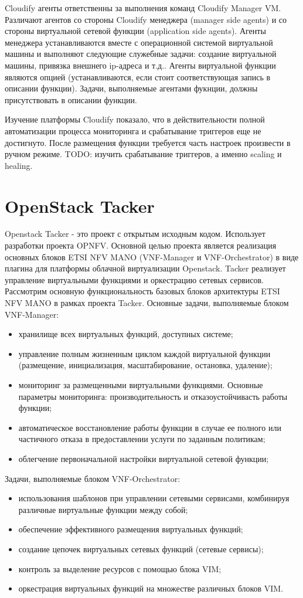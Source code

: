 \documentclass[oneside,final,14pt,a4paper]{extreport}
\begin{document}
Cloudify агенты ответственны за выполнения команд Cloudify Manager VM. Различают агентов со стороны Cloudify менеджера (manager side agents) и со стороны виртуальной сетевой функции (application side agents). Агенты менеджера устанавливаются вместе с операционной системой виртуальной машины и выполняют следующие служебные задачи: создание виртуальной машины, привязка внешнего ip-адреса и т.д.. Агенты виртуальной функции являются опцией (устанавливаются, если стоит соответствующая запись в описании функции). Задачи, выполняемые агентами фукнции, должны присутствовать в описании функции.\cite{cloudify-official-oveview1}

Изучение платформы Cloudify показало, что в действительности полной автоматизации процесса мониторинга и срабатывание триггеров еще не достигнуто. После размещения функции требуется часть настроек произвести в ручном режиме. 
TODO: изучить срабатывание триггеров, а именно scaling и healing.


\section{OpenStack Tacker}
Openstack Tacker - это проект с открытым исходным кодом. Использует разработки проекта OPNFV. Основной целью проекта является реализация основных блоков ETSI NFV MANO (VNF-Manager и VNF-Orchestrator) в виде плагина для платформы облачной виртуализации Openstack. Tacker реализует управление виртуальными функциями и оркестрацию сетевых сервисов.
	Рассмотрим основную функциональность базовых блоков архитектуры ETSI NFV MANO в рамках проекта Tacker. Основные задачи, выполняемые блоком VNF-Manager:
\begin{itemize}
	\item хранилище всех виртуальных функций, доступных системе;
	\item управление полным жизненным циклом каждой виртуальной функции (размещение, инициализация, масштабирование, остановка, удаление);
	\item мониторинг за размещенными виртуальными функциями. Основные параметры мониторинга: производительность и отказоустойчивасть работы функции;
	\item автоматическое восстановление работы функции в случае ее полного или частичного отказа в предоставлении услуги по заданным политикам;
	\item облегчение первоначальной настройки виртуальной сетевой функции;
\end{itemize}
Задачи, выполняемые блоком VNF-Orchestrator:
\begin{itemize}
	\item использования шаблонов при управлении сетевыми сервисами, комбинируя различные виртуальные функции между собой;
	\item обеспечение эффективного размещения виртуальных функций;
	\item создание цепочек виртуальных сетевых функций (сетевые сервисы);
	\item контроль за выделение ресурсов с помощью блока VIM;
	\item оркестрация виртуальных функций на множестве различных блоков VIM.
\end{itemize}
\end{document}
